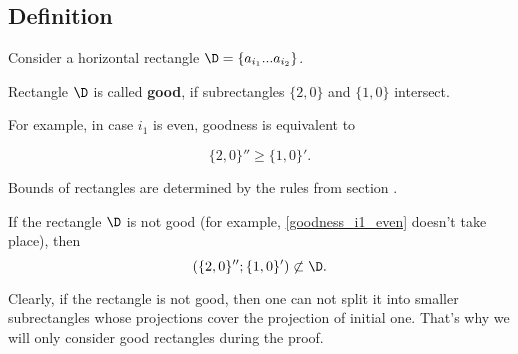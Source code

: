 \subsection{Definition}

Consider a horizontal rectangle $\D = \left\{ a_{i_1} ... a_{i_2} \right\}$.

\begin{definition}
	Rectangle $\D$ is called \textbf{good},
	if subrectangles
	$\{2, 0\}$ and $\{1, 0\}$ intersect.
\end{definition}


For example, in case $i_1$ is even, goodness is equivalent to

\begin{equation}\label{goodness_i1_even}
	\{2, 0\}'' \geqslant \{1, 0\}'.
\end{equation}

Bounds of rectangles are determined by the rules from section .

If the rectangle $\D$ is not good (for example, \ref{goodness_i1_even} doesn't take place), then
$$ ( \{2, 0\}'' ; \{1, 0\}' ) \not\subset \D. $$

Clearly, if the rectangle is not good,
then one can not split it into smaller subrectangles whose projections cover the projection of initial one.
That's why we will only consider good rectangles during the proof.
